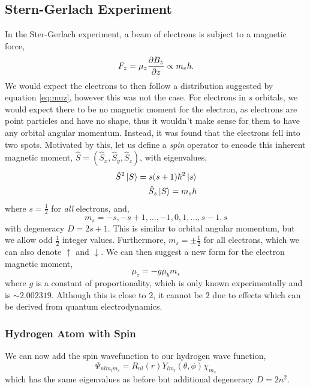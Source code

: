 \documentclass{book}
\begin{document}
\subsection{Stern-Gerlach Experiment}
In the Ster-Gerlach experiment, a beam of electrons is subject to a magnetic force,
\begin{equation}
	F_z = \mu_z\pdv{B_z}{z} \propto m_e\hbar.
\end{equation}
We would expect the electrons to then follow a distribution suggested by equation \eqref{eq:muz}, however this was not the case. For electrons in $s$ orbitals, we would expect there to be no magnetic moment for the electron, as electrons are point particles and have no shape, thus it wouldn't make sense for them to have any orbital angular momentum. Instead, it was found that the electrons fell into two spots. Motivated by this, let us define a \textit{spin} operator to encode this inherent magnetic moment, $\hat{S} = \left(\hat{S}_x, \hat{S}_y, \hat{S}_z\right)$, with eigenvalues,
\begin{align}
	\hat{S}^2\ket{S} = s(s+1)\hbar^2\ket{s} \\
	\hat{S}_z\ket{S} = m_s\hbar
\end{align}
where $s=\frac{1}{2}$ for \textit{all} electrons, and,
\begin{equation}
	m_s = -s, -s+1,\ldots,-1,0,1,\ldots,s-1,s
\end{equation}
with degeneracy $D = 2s+1$. This is similar to orbital angular momentum, but we allow odd $\frac{1}{2}$ integer values. Furthermore, $m_s = \pm \frac{1}{2}$ for all electrons, which we can also denote $\uparrow$ and $\downarrow$. We can then suggest a new form for the electron magnetic moment,
\begin{equation}
	\mu_z = -g\mu_bm_s
\end{equation}
where $g$ is a constant of proportionality, which is only known experimentally and is $\sim2.002319$. Although this is close to $2$, it cannot be $2$ due to effects which can be derived from quantum electrodynamics.
\subsubsection{Hydrogen Atom with Spin}
We can now add the spin wavefunction to our hydrogen wave function,
\begin{equation}
	\Psi_{nlm_lm_s} = R_{nl}(r)Y_{lm_l}(\theta,\phi)\chi_{m_s}
\end{equation}
which has the same eigenvalues as before but additional degeneracy $D = 2n^2$.
\end{document}
